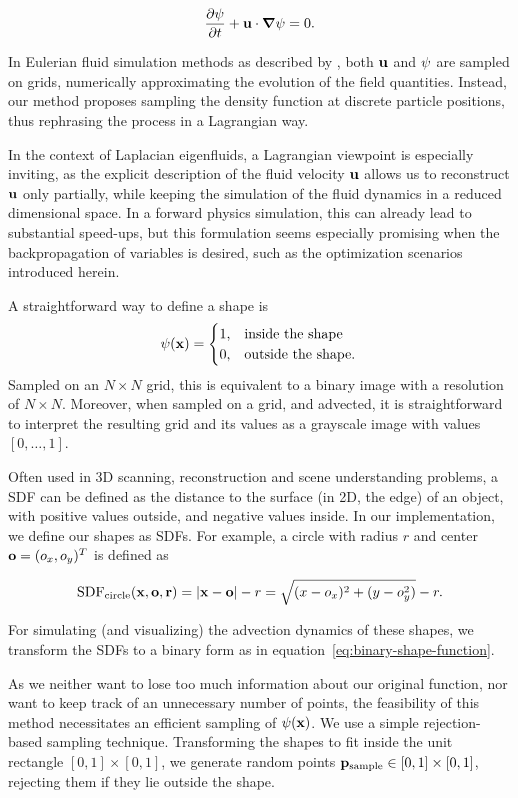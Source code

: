$$\pdv{\psi}{t} + \vb{u}\cdot \grad{\psi} = 0.$$

In Eulerian fluid simulation methods as described by \cite{StableFluids}, both
$\vb{u}$ and $\vb{\psi}$ are sampled on grids, numerically approximating the
evolution of the field quantities. Instead, our method proposes sampling the
density function at discrete particle positions, thus rephrasing the process in
a Lagrangian way.

In the context of Laplacian eigenfluids, a Lagrangian viewpoint is especially
inviting, as the explicit description of the fluid velocity $\vb{u}$  allows us to reconstruct $\vb{u}$ only partially, while keeping the
simulation of the fluid dynamics in a reduced dimensional space. In a forward
physics simulation, this can already lead to substantial speed-ups, but this
formulation seems especially promising when the backpropagation of variables is
desired, such as the optimization scenarios introduced herein.

A straightforward way to define a shape is
\begin{equation}\label{eq:binary-shape-function}
\psi(\vb{x}) = 
\begin{cases}
  1, & \qq*{inside the shape}\\
  0, & \text{outside the shape}.\\
\end{cases}
\end{equation}
Sampled on an $N \times N$ grid, this is equivalent to a binary image with
a resolution of $N \times N$. Moreover, when sampled on a grid, and advected,
it is straightforward to interpret the resulting grid and its values as
a grayscale image with values $[0,\dots,1]$.

Often used in 3D scanning, reconstruction and scene understanding problems,
a \acf{SDF} can be defined as the distance to the surface (in 2D, the edge) of
an object, with positive values outside, and negative values inside. In our
implementation, we define our shapes as \acp{SDF}. For example, a circle with
radius $r$ and center $\vb{o} = (o_x, o_y)^T$ is defined as

$$\text{SDF}_{\text{circle}}(\vb{x, \vb{o}, r}) 
  = \abs{\vb{x}-\vb{o}} - r
  = \sqrt{(x-o_x)^2 + (y-o_y^2)} - r.$$

For simulating (and visualizing) the advection dynamics of these shapes, we
transform the SDFs to a binary form as in
equation~\eqref{eq:binary-shape-function}.

As we neither want to lose too much information about our original function, nor
want to keep track of an unnecessary number of points, the feasibility of this
method necessitates an efficient sampling of $\psi(\vb{x})$. We use a simple
rejection-based sampling technique. Transforming the shapes to fit inside the
unit rectangle $[0,1]\times[0,1]$, we generate random points
$\vb{p}_\text{sample}\in [0,1]\times[0,1]$, rejecting them if they lie outside
the shape.

